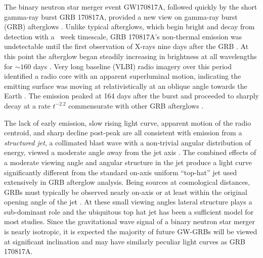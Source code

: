 \documentclass[twocolumn]{aastex62}
\newcommand{\gwbns}{GW170817A}
\newcommand{\grbbns}{GRB 170817A}
\begin{document}
The binary neutron star merger event \gwbns{}, followed quickly by the short gamma-ray burst \grbbns{}, provided a new view on gamma-ray burst (GRB) afterglows \citep{Abbott:2017ab, Abbott:2017ac}.  Unlike typical afterglows, which begin bright and decay from detection with a ~week timescale, \grbbns{}'s non-thermal emission was undetectable until the first observation of X-rays nine days after the GRB \citep{Troja:2017aa}.  At this point the afterglow began steadily increasing in brightness at all wavelengths for $\sim160$ days \citep{Haggard:2017aa, Hallinan:2017aa, DAvanzo:2018aa,  Lyman:2018aa, Margutti:2018aa, Mooley:2018aa, Troja:2018aa, Troja:2019ab}.  Very long baseline (VLBI) radio imagery over this period identified a radio core with an apparent superluminal motion, indicating the emitting surface was moving at relativistically at an oblique angle towards the Earth \citep{Mooley:2018ab}. The emission peaked at 164 days after the burst and proceeded to sharply decay at a rate $t^{-2.2}$ commensurate with other GRB afterglows \citep{Alexander:2018aa, Fong:2019aa, Lamb:2019aa, Troja:2019ab}.

The lack of early emission, slow rising light curve, apparent motion of the radio centroid, and sharp decline post-peak are all consistent with emission from a \emph{structured jet}, a collimated blast wave with a non-trivial angular distribution of energy, viewed a moderate angle away from the jet axis \citep{Lamb:2017aa, Alexander:2018aa, Hotokezaka:2018aa, Wu:2018aa, Xie:2018aa,  Ghirlanda:2019aa, Fong:2019aa, Lamb:2019aa, Troja:2019aa}.  The combined effects of a moderate viewing angle and angular structure in the jet produce a light curve significantly different from the standard on-axis uniform ``top-hat'' jet used extensively in GRB afterglow analysis. Being sources at cosmological distances, GRBs must typically be observed nearly on-axis or at least within the original opening angle of the jet \citep{Ryan:2015aa}. At these small viewing angles lateral structure plays a sub-dominant role and the ubiquitous top hat jet has been a sufficient model for most studies.  Since the gravitational wave signal of a binary neutron star merger is nearly isotropic, it is expected the majority of future GW-GRBs will be viewed at significant inclination and may have similarly peculiar light curves as \grbbns{}.
\end{document}
